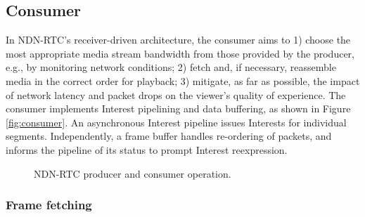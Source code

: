 \documentclass{icn/sig-alternate-2013} %
\newcommand{\ndnrtcName}{NDN-RTC} %
\begin{document}
\subsection{Consumer}
\label{sec:consumer}

In \ndnrtcName{}'s receiver-driven architecture, the consumer aims to 1) choose the most appropriate media stream bandwidth from those provided by the producer, e.g., by monitoring network conditions; 2) fetch and, if necessary, reassemble media in the correct order for playback; 3) mitigate, as far as possible, the impact of network latency and packet drops on the viewer's quality of experience.  
The consumer implements Interest pipelining and data buffering, as shown in Figure \ref{fig:consumer}. An asynchronous Interest pipeline issues Interests for individual segments. Independently, a frame buffer handles re-ordering of packets, and informs the pipeline of its status to prompt Interest reexpression.

\begin{figure}[t!]
\centering
{}\qquad
{}
\caption{\ndnrtcName{} producer and consumer operation.}
\end{figure}

\subsubsection{Frame fetching}
\end{document}
